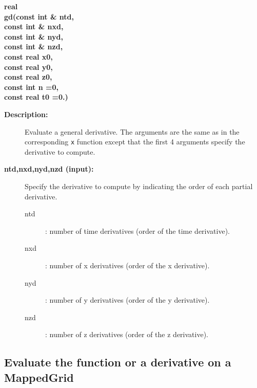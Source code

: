  
\begin{flushleft} \textbf{%
real  \\ 
\settowidth{\OGFunctionIncludeArgIndent}{gd(}%
gd(const int \& ntd, \\ 
\hspace{\OGFunctionIncludeArgIndent}const int \& nxd, \\ 
\hspace{\OGFunctionIncludeArgIndent}const int \& nyd, \\ 
\hspace{\OGFunctionIncludeArgIndent}const int \& nzd,\\ 
\hspace{\OGFunctionIncludeArgIndent}const real x0, \\ 
\hspace{\OGFunctionIncludeArgIndent}const real y0, \\ 
\hspace{\OGFunctionIncludeArgIndent}const real z0, \\ 
\hspace{\OGFunctionIncludeArgIndent}const int n  =0, \\ 
\hspace{\OGFunctionIncludeArgIndent}const real t0  =0.)
}\end{flushleft}
\begin{description}
\item[{\bf Description:}]  Evaluate a general derivative. The arguments are the same as in the
 corresponding {\tt x} function except that the first 4 arguments specify the derivative
 to compute.
\item[{\bf ntd,nxd,nyd,nzd (input):}]  Specify the derivative to compute by indicating the order
   of each partial derivative. 
    \begin{description}
       \item[ntd] : number of time derivatives (order of the time derivative).
       \item[nxd] : number of x derivatives (order of the x derivative).
       \item[nyd] : number of y derivatives (order of the y derivative).
       \item[nzd] : number of z derivatives (order of the z derivative).
    \end{description}
\end{description}
\subsection{Evaluate the function or a derivative on a MappedGrid}
 
